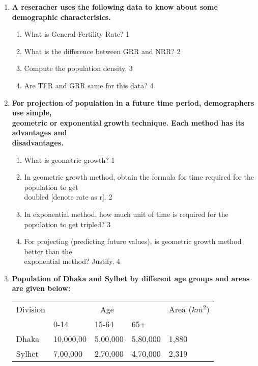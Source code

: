 \documentclass[a4paper,oneside, margin=1.4in]{book}
\begin{document}
  \begin{enumerate}
  
   \item
	  \textbf{A reseracher uses the following data to know about some demographic characterisics.} 
  
  \begin{enumerate}
    \item
	What is General Fertility Rate? \hfill 1
    \item
	What is the difference between GRR and NRR? \hfill 2
    \item  
	Compute the population density. \hfill 3
    \item
	Are TFR and GRR same for this data? \hfill 4
  \end{enumerate}
  
 \item
  \textbf{For projection of population in a future time period, demographers use simple, \\ geometric or exponential growth technique. Each method has its advantages and \\ disadvantages.}

  \begin{enumerate}
    \item
	What is geometric growth? \hfill 1
    \item
    	In geometric growth method, obtain the formula for time required for the population to get \\ doubled [denote rate as r]. \hfill 2
    \item
    	In exponential method, how much unit of time is required for the population to get tripled?  \hfill 3
     \item
     	For projecting (predicting future values), is geometric growth method better than the \\ exponential method? Justify.  \hfill 4
  \end{enumerate}
  
     \item
	  \textbf{Population of Dhaka and Sylhet by different age groups and areas are given below:} 
	  
	  \begin{table}[h]
	  \begin{center}
\begin{tabular}{lllll}
Division & \multicolumn{3}{c}{Age}         & Area ($km^2$) \\
         & 0-14      & 15-64    & 65+      &               \\
Dhaka    & 10,000,00 & 5,00,000 & 5,80,000 & 1,880         \\
Sylhet   & 7,00,000  & 2,70,000 & 4,70,000 & 2,319        
\end{tabular}
\end{center}
\end{table}
  

\end{enumerate}
\end{document}
